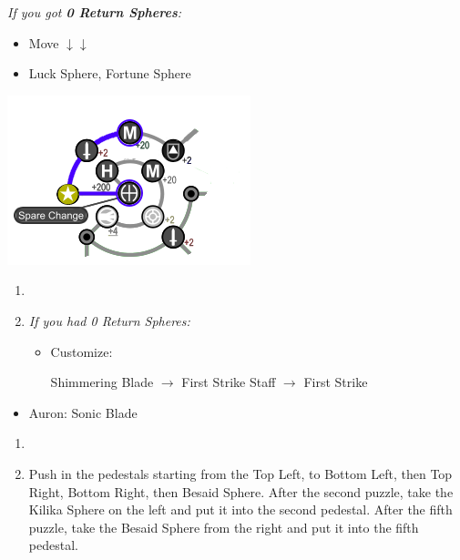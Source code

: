 \begin{spheregrid}
\begin{itemize}
\begin{itemize}
\begin{multicols}{2}
				\item \textit{If you got \textbf{0 Return Spheres}:}
				      \begin{itemize}
					      \item Move $\downarrow\downarrow$
					      \item Luck Sphere, Fortune Sphere
				      \end{itemize}
				      \includegraphics{graphics/0_return_w_luck}
			\end{multicols}
		\end{itemize}
	\end{itemize}
\end{spheregrid}
\begin{enumerate}[resume]
	\item \formation{\tidus}{\auron}{\yuna}

	\item \textit{If you had 0 Return Spheres:}
	      \begin{itemize}
		      \item Customize:
		            \begin{itemize}
			            \auronf Shimmering Blade $\rightarrow$ First Strike
			            \yunaf Staff $\rightarrow$ First Strike
		            \end{itemize}
	      \end{itemize}
\end{enumerate}
\begin{equip}
	\begin{itemize}
		\item Auron: Sonic Blade
	\end{itemize}
\end{equip}
\begin{enumerate}[resume]
	\item {\large \save}
	\item Push in the pedestals starting from the Top Left, to Bottom Left, then Top Right, Bottom Right, then Besaid Sphere. After the second puzzle, take the Kilika Sphere on the left and put it into the second pedestal. After the fifth puzzle, take the Besaid Sphere from the right and put it into the fifth pedestal.
\end{enumerate}
